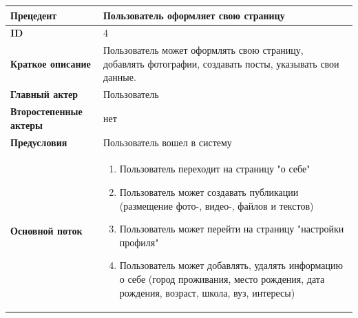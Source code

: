 \begin{center}
  \begin{tabular}{|l|p{9cm}|}
  \hline
  \textbf{Прецедент} & Пользователь оформляет свою страницу \\
  \hline
  \textbf{ID} & 4 \\
  \hline
  \textbf{Краткое описание} & Пользователь может оформлять свою страницу, добавлять фотографии, создавать посты, указывать свои данные. \\
  \hline
  \textbf{Главный актер} & Пользователь\\
  \hline
  \textbf{Второстепенные актеры} & нет \\
  \hline
  \textbf{Предусловия} & Пользователь вошел в систему \\
  \hline
  \textbf{Основной поток} & \begin{enumerate}
    \item Пользователь переходит на страницу "о себе"
    \item Пользователь может создавать публикации (размещение фото-, видео-, файлов и текстов)
    \item Пользователь может перейти на страницу "настройки профиля"
    \item  Пользователь может добавлять, удалять информацию о себе (город проживания, место рождения, дата рождения, возраст, школа, вуз, интересы)
  \end{enumerate} \\
  \hline
\end{tabular}
\end{center}

